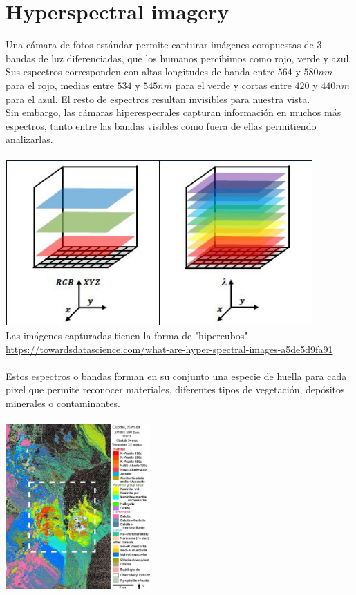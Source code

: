 \section{Hyperspectral imagery}
Una cámara de fotos estándar permite capturar imágenes compuestas de 3  bandas de luz diferenciadas, que los humanos percibimos como rojo, verde y azul. Sus espectros corresponden con altas longitudes de banda entre $564$ y $580 nm$ para el rojo, medias  entre $534$ y $545 nm$ para el verde y cortas entre $420$ y $440 nm$ para el azul. El resto de espectros resultan invisibles para nuestra vista.
\\
Sin embargo, las cámaras hiperespecrales capturan información en muchos más espectros, tanto entre las bandas visibles como fuera de ellas permitiendo analizarlas.
\\
\\
\includegraphics[height=2.5in]{figures/rgb_vs_hsi.jpeg}
\\
Las imágenes capturadas tienen la forma de "hipercubos"
\\
\url{https://towardsdatascience.com/what-are-hyper-spectral-images-a5de5d9fa91}
\\
\\
Estos espectros o bandas forman en su conjunto una especie de huella para cada pixel que permite reconocer materiales, diferentes tipos de vegetación, depósitos minerales o contaminantes.
\\
\\
\includegraphics[height=2.5in]{figures/cuprite.png}
